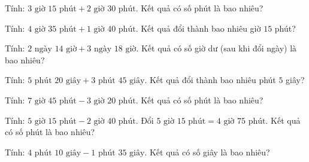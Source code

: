
\begin{ex}
  Tính: $3\text{ giờ } 15\text{ phút} + 2\text{ giờ } 30\text{ phút}$. Kết quả có số phút là bao nhiêu?
\end{ex}

\begin{ex}
  Tính: $4\text{ giờ } 35\text{ phút} + 1\text{ giờ } 40\text{ phút}$. Kết quả đổi thành bao nhiêu giờ $15$ phút?
\end{ex}

\begin{ex}
  Tính: $2\text{ ngày } 14\text{ giờ} + 3\text{ ngày } 18\text{ giờ}$. Kết quả có số giờ dư (sau khi đổi ngày) là bao nhiêu?
\end{ex}

\begin{ex}
  Tính: $5\text{ phút } 20\text{ giây} + 3\text{ phút } 45\text{ giây}$. Kết quả đổi thành bao nhiêu phút $5$ giây?
\end{ex}

\begin{ex}
  Tính: $7\text{ giờ } 45\text{ phút} - 3\text{ giờ } 20\text{ phút}$. Kết quả có số phút là bao nhiêu?
\end{ex}

\begin{ex}
  Tính: $5\text{ giờ } 15\text{ phút} - 2\text{ giờ } 40\text{ phút}$. Đổi $5\text{ giờ } 15\text{ phút} = 4\text{ giờ } 75\text{ phút}$. Kết quả có số phút là bao nhiêu?
\end{ex}

\begin{ex}
  Tính: $4\text{ phút } 10\text{ giây} - 1\text{ phút } 35\text{ giây}$. Kết quả có số giây là bao nhiêu?
\end{ex}

